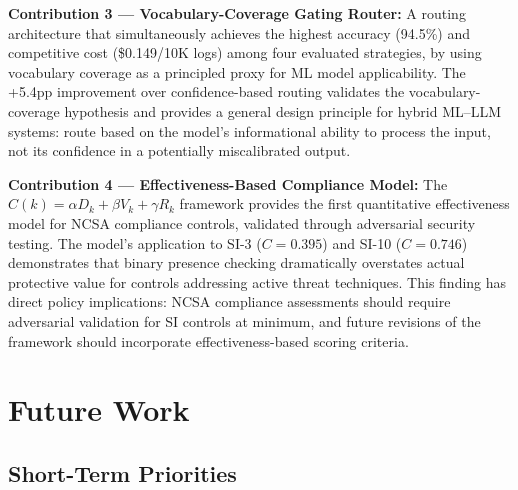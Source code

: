 \documentclass[12pt,oneside]{report}
\begin{document}
\textbf{Contribution 3 — Vocabulary-Coverage Gating Router:} A routing architecture that simultaneously achieves the highest accuracy (94.5\%) and competitive cost (\$0.149/10K logs) among four evaluated strategies, by using vocabulary coverage as a principled proxy for ML model applicability. The +5.4pp improvement over confidence-based routing validates the vocabulary-coverage hypothesis and provides a general design principle for hybrid ML--LLM systems: route based on the model's informational ability to process the input, not its confidence in a potentially miscalibrated output.

\textbf{Contribution 4 — Effectiveness-Based Compliance Model:} The $C(k) = \alpha D_k + \beta V_k + \gamma R_k$ framework provides the first quantitative effectiveness model for NCSA compliance controls, validated through adversarial security testing. The model's application to SI-3 ($C = 0.395$) and SI-10 ($C = 0.746$) demonstrates that binary presence checking dramatically overstates actual protective value for controls addressing active threat techniques. This finding has direct policy implications: NCSA compliance assessments should require adversarial validation for SI controls at minimum, and future revisions of the framework should incorporate effectiveness-based scoring criteria.

\section{Future Work}

\subsection{Short-Term Priorities}
\end{document}
